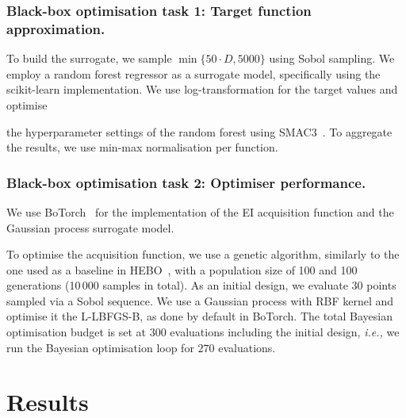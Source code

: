 \subsubsection*{Black-box optimisation task 1: Target function approximation.}

To build the surrogate, we sample $\min\{50 \cdot D, 5000\}$ using Sobol sampling.
We employ a random forest regressor as a surrogate model, specifically using the scikit-learn implementation. 
We use log-transformation for the target values and optimise 

the hyperparameter settings of the random forest using SMAC3~\citep{LinEtAl22b}.
To aggregate the results, we use min-max normalisation per function.
\subsubsection*{Black-box optimisation task 2: Optimiser performance.}
We use BoTorch~\citep{BalEtAl19} for the implementation of the EI acquisition function and the Gaussian process surrogate model.

To optimise the acquisition function, we use a genetic algorithm, similarly to the one used as a baseline in HEBO~\citep{CowEtAl22}, with a population size of 100 and 100 generations (10\,000 samples in total).
As an initial design, we evaluate $30$ points sampled via a Sobol sequence.
We use a Gaussian process with RBF kernel and optimise it the L-LBFGS-B, as done by default in BoTorch.
The total Bayesian optimisation budget is set at $300$ evaluations including the initial design, \emph{i.e.,} we run the Bayesian optimisation loop for $270$ evaluations.
































\section{Results}
\label{sec:ch04:res}


